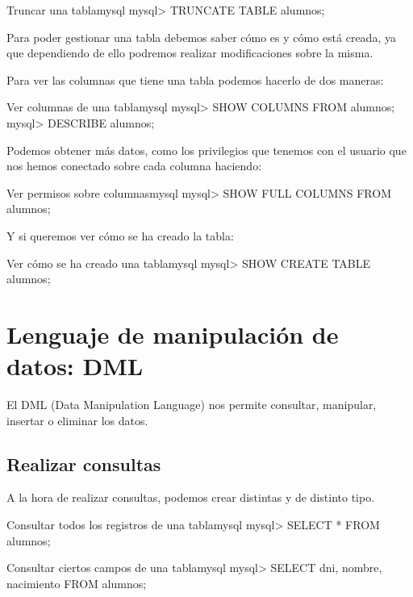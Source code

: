 \begin{mycode}{Truncar una tabla}{mysql}{}
mysql> TRUNCATE TABLE alumnos;
\end{mycode}

Para poder gestionar una tabla debemos saber cómo es y cómo está creada, ya que dependiendo de ello podremos realizar modificaciones sobre la misma.

Para ver las columnas que tiene una tabla podemos hacerlo de dos maneras:

\begin{mycode}{Ver columnas de una tabla}{mysql}{}
mysql> SHOW COLUMNS FROM alumnos;
mysql> DESCRIBE alumnos;
\end{mycode}

Podemos obtener más datos, como los privilegios que tenemos con el usuario que nos hemos conectado sobre cada columna haciendo:

\begin{mycode}{Ver permisos sobre columnas}{mysql}{}
mysql> SHOW FULL COLUMNS FROM alumnos;
\end{mycode}

Y si queremos ver cómo se ha creado la tabla:

\begin{mycode}{Ver cómo se ha creado una tabla}{mysql}{}
mysql> SHOW CREATE TABLE alumnos;
\end{mycode}


\section{Lenguaje de manipulación de datos: DML}
El DML (Data Manipulation Language) nos permite consultar, manipular, insertar o eliminar los datos.

\subsection{Realizar consultas}
A la hora de realizar consultas, podemos crear distintas y de distinto tipo.

\begin{mycode}{Consultar todos los registros de una tabla}{mysql}{}
mysql> SELECT * FROM alumnos;
\end{mycode}


\begin{mycode}{Consultar ciertos campos de una tabla}{mysql}{}
mysql> SELECT dni, nombre, nacimiento FROM alumnos;
\end{mycode}

